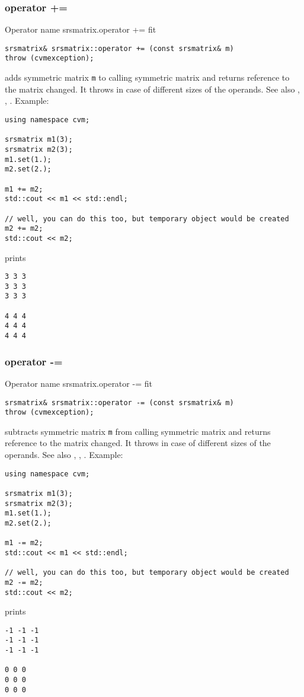 \subsubsection{operator +=}
Operator%
\pdfdest name {srsmatrix.operator +=} fit
\begin{verbatim}
srsmatrix& srsmatrix::operator += (const srsmatrix& m)
throw (cvmexception);
\end{verbatim}
adds symmetric matrix \verb"m" to  calling symmetric matrix 
and returns  reference to
the matrix changed.
It throws  
in case of different sizes of the operands.
See also ,
,
.
Example:
\begin{Verbatim}
using namespace cvm;

srsmatrix m1(3);
srsmatrix m2(3);
m1.set(1.);
m2.set(2.);

m1 += m2;
std::cout << m1 << std::endl;

// well, you can do this too, but temporary object would be created
m2 += m2; 
std::cout << m2;
\end{Verbatim}
prints
\begin{Verbatim}
3 3 3
3 3 3
3 3 3

4 4 4
4 4 4
4 4 4
\end{Verbatim}
\newpage




\subsubsection{operator -=}
Operator%
\pdfdest name {srsmatrix.operator -=} fit
\begin{verbatim}
srsmatrix& srsmatrix::operator -= (const srsmatrix& m)
throw (cvmexception);
\end{verbatim}
subtracts symmetric matrix \verb"m" from  calling symmetric matrix
and returns  reference to
the matrix changed.
It throws  
in case of different sizes of the operands.
See also ,
,
.
Example:
\begin{Verbatim}
using namespace cvm;

srsmatrix m1(3);
srsmatrix m2(3);
m1.set(1.);
m2.set(2.);

m1 -= m2;
std::cout << m1 << std::endl;

// well, you can do this too, but temporary object would be created
m2 -= m2; 
std::cout << m2;
\end{Verbatim}
prints
\begin{Verbatim}
-1 -1 -1
-1 -1 -1
-1 -1 -1

0 0 0
0 0 0
0 0 0
\end{Verbatim}
\newpage



